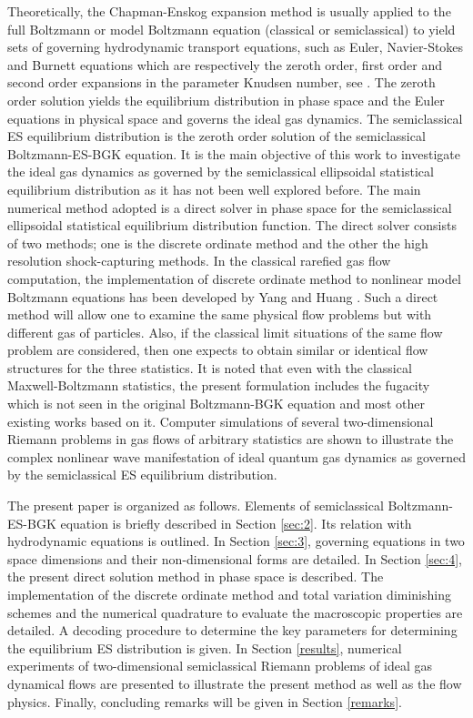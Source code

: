 \documentclass{rsproca}%
\begin{document}
Theoretically, the Chapman-Enskog expansion method is usually applied to the full Boltzmann or model Boltzmann equation (classical or semiclassical) to yield sets of governing hydrodynamic transport equations, such as Euler, Navier-Stokes and Burnett equations which are respectively the zeroth order, first order and second order expansions in the parameter Knudsen number,  see \cite{Cowling1970}.   The zeroth order solution yields the equilibrium distribution in phase space and the Euler equations in physical space and governs the ideal gas dynamics.  The semiclassical ES equilibrium distribution is the zeroth order solution of the semiclassical Boltzmann-ES-BGK equation.  It is the main objective of this work to investigate the ideal gas dynamics as governed by the semiclassical ellipsoidal statistical equilibrium distribution as it has not been well explored before.   The main numerical method adopted is a direct solver in phase space for the semiclassical ellipsoidal statistical equilibrium distribution function.  The direct solver consists of two methods; one is the discrete ordinate method and the other the high resolution shock-capturing methods.   In the classical rarefied gas flow computation, the implementation of discrete ordinate method to nonlinear model Boltzmann equations has been developed by Yang and Huang \cite{Yang1995323}.  Such a direct method will allow one to examine the same physical flow problems but with different gas of particles.   Also, if the classical limit situations of the same flow problem are considered, then one expects to obtain similar or identical flow structures for the three statistics.   It is noted that even with the classical Maxwell-Boltzmann statistics, the present formulation includes the fugacity which is not seen in the original Boltzmann-BGK equation \cite{PhysRev.94.511} and most other existing works based on it.  Computer simulations of several two-dimensional Riemann problems in gas flows of arbitrary statistics are shown to illustrate the complex nonlinear wave manifestation of ideal quantum gas dynamics as governed by the semiclassical ES equilibrium distribution.


The present paper is organized as follows.  Elements of semiclassical Boltzmann-ES-BGK equation is briefly described in Section \ref{sec:2}. Its relation with hydrodynamic equations is outlined. In Section \ref{sec:3}, governing equations in two space dimensions and their non-dimensional forms are detailed. In Section \ref{sec:4}, the present direct solution method in phase space is described.   The implementation of the discrete ordinate method and total variation diminishing schemes and the numerical quadrature to evaluate the macroscopic properties are detailed.   A decoding procedure to determine the key parameters for determining the equilibrium ES distribution is given.  In Section \ref{results}, numerical experiments of two-dimensional semiclassical Riemann problems of ideal gas dynamical flows are presented to illustrate the present method as well as the flow physics. Finally, concluding remarks will be given in Section \ref{remarks}.
\end{document}
